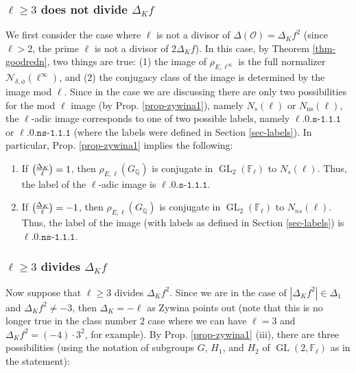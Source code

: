\documentclass[11pt]{amsart}
\theoremstyle{definition}
\newenvironment{romanenum}{\hfill \begin{enumerate} \renewcommand{\theenumi}{\roman{enumi}}}{\end{enumerate}}
\newcommand{\QQ}{\mathbb Q}
\newcommand{\F}{\mathbb F}
\newcommand{\FF}{\mathbb F}
\newcommand\legendre[2]{{#1\overwithdelims () #2}}
\newcommand{\GL}{\operatorname{GL}}
\begin{document}
 \subsubsection{$\ell\geq 3$ does not divide $\Delta_K f$}\label{sec-ellnotdividedisc} We first consider the case where $\ell$  is not a  divisor of $\Delta(\mathcal{O})=\Delta_K f^2$ (since $\ell>2$, the prime $\ell$ is not a divisor of $2\Delta_K f$). In this case, by Theorem \ref{thm-goodredn}, two things are true: (1) the image of $\rho_{E,\ell^\infty}$ is  the full normalizer $\mathcal{N}_{\delta,\phi}(\ell^\infty)$, and (2) the conjugacy class of the image is determined by the image mod $\ell$. Since in the case we are discussing there are only two possibilities for the  mod $\ell$ image (by Prop. \ref{prop-zywina1}), namely $N_s(\ell)$ or $N_{\text{ns}}(\ell)$, the $\ell$-adic image corresponds to one of two possible labels, namely $\ell\texttt{.}0\texttt{.s-1.1.1}$ or $\ell\texttt{.}0\texttt{.ns-1.1.1}$ (where the labels were defined in Section \ref{sec-labels}). In particular, Prop. \ref{prop-zywina1} implies the following:
\begin{romanenum}
\item \label{P:CM main a}
If $\legendre{\Delta_K}{\ell}=1$, then $\rho_{E,\ell}(G_\QQ)$ is conjugate in $\GL_2(\FF_\ell)$ to $N_s(\ell)$. Thus, the label of the $\ell$-adic image  is $\ell\texttt{.}0\texttt{.s-1.1.1}$.
\item \label{P:CM main b}
If $\legendre{\Delta_K}{\ell}=-1$, then $\rho_{E,\ell}(G_\QQ)$ is conjugate in $\GL_2(\FF_\ell)$ to $N_{ns}(\ell)$. Thus, the label of the image (with labels as defined in Section \ref{sec-labels}) is $\ell\texttt{.}0\texttt{.ns-1.1.1}$.
\end{romanenum}

 \subsubsection{$\ell\geq 3$ divides $\Delta_K f$}\label{sec-elldividesdisc} Now suppose that $\ell\geq 3$ divides $\Delta_K f^2$. Since we are in the case of $|\Delta_K f^2|\in \Delta_1$ and $\Delta_K f^2\neq -3$, then $\Delta_K=-\ell$ as Zywina points out (note that this is no longer true in the class number $2$ case where we can have $\ell=3$ and $\Delta_K f^2=(-4)\cdot 3^2$, for example). By Prop. \ref{prop-zywina1} (iii), there are three possibilities (using the notation of subgroups $G$, $H_1$, and $H_2$ of  $\GL(2,\F_\ell)$ as in  the statement): 
\end{document}
